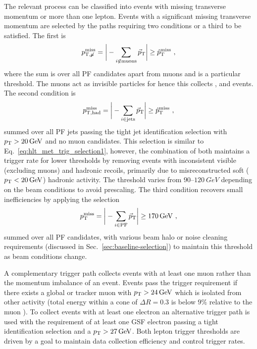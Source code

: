 The relevant process can be classified into events with missing transverse momentum or more than one lepton. Events with a significant missing transverse momentum are selected by the \SWT paths requiring two conditions or a third to be satisfied. The first is
%
\begin{equation}\label{eq:hlt_met_trig_selection1}
    p_{\text{T,}\not\mu}^{\mathrm{miss}} = \bigg| -\sum_{i\not\in\mathrm{muons}} \vec{p}_{\mathrm{T}} \bigg| \ge \hat{p}_{\text{T}}^{\mathrm{miss}}\ ,
\end{equation}
%
where the sum is over all PF candidates apart from muons and \ptmissthresh is a particular threshold. The muons act as invisible particles for \ptmissnomu hence this collects \IZvv, \IWmv and \IDYmm events. The second condition is
%
\begin{equation}
    p_{\mathrm{T,had}}^{\mathrm{miss}} = \bigg| -\sum_{i\in\mathrm{jets}} \vec{p}_{\mathrm{T}} \bigg| \ge \ptmissthresh\ ,
\end{equation}
%
summed over all PF jets passing the tight jet identification selection with ${p_{\text{T}}>\SI{20}{GeV}}$ and no muon candidates. This selection is similar to Eq.~\ref{eq:hlt_met_trig_selection1}, however, the combination of both maintains a trigger rate for lower \ptmissthresh  thresholds by removing events with inconsistent visible (excluding muons) and hadronic recoils, primarily due to misreconstructed soft (${p_{\text{T}}<\SI{20}{GeV}}$) hadronic activity. The threshold \ptmissthresh varies from {$90$--$\SI{120}{GeV}$} depending on the \LHC beam conditions to avoid prescaling. The third condition recovers small inefficiencies by applying the selection
%
\begin{equation}
    p_{\text{T}}^{\mathrm{miss}} = \bigg| -\sum_{i\in\mathrm{PF}} \vec{p}_{\mathrm{T}} \bigg| \ge \SI{170}{GeV}\ ,
\end{equation}
%
summed over all PF candidates, with various beam halo or \HCAL noise cleaning requirements (discussed in Sec.~\ref{sec:baseline-selection}) to maintain this threshold as beam conditions change.

A complementary trigger path collects events with at least one muon rather than the momentum imbalance of an event. Events pass the trigger requirement if there exists a global or tracker muon with ${p_{\text{T}}>\SI{24}{GeV}}$ which is isolated from other activity (total energy within a cone of $\Delta R=0.3$ is below $9\%$ relative to the muon \pt). To collect events with at least one electron an alternative trigger path is used with the requirement of at least one GSF electron passing a tight identification selection and a ${p_{\text{T}}>\SI{27}{GeV}}$. Both lepton trigger thresholds are driven by a goal to maintain data collection efficiency and control trigger rates.


